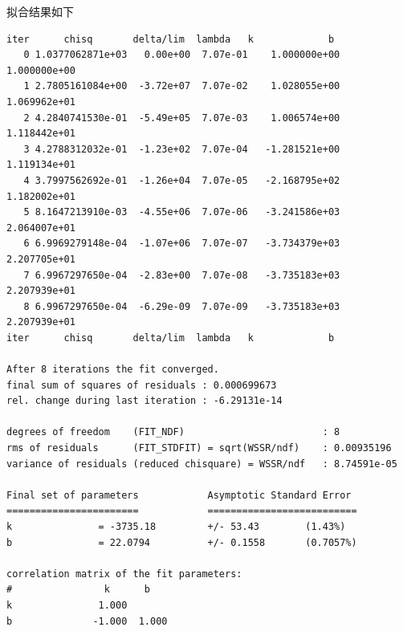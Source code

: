 \documentclass[11pt]{report}
\begin{document}
\begin{enumerate}
拟合结果如下
\begin{verbatim}
iter      chisq       delta/lim  lambda   k             b            
   0 1.0377062871e+03   0.00e+00  7.07e-01    1.000000e+00   1.000000e+00
   1 2.7805161084e+00  -3.72e+07  7.07e-02    1.028055e+00   1.069962e+01
   2 4.2840741530e-01  -5.49e+05  7.07e-03    1.006574e+00   1.118442e+01
   3 4.2788312032e-01  -1.23e+02  7.07e-04   -1.281521e+00   1.119134e+01
   4 3.7997562692e-01  -1.26e+04  7.07e-05   -2.168795e+02   1.182002e+01
   5 8.1647213910e-03  -4.55e+06  7.07e-06   -3.241586e+03   2.064007e+01
   6 6.9969279148e-04  -1.07e+06  7.07e-07   -3.734379e+03   2.207705e+01
   7 6.9967297650e-04  -2.83e+00  7.07e-08   -3.735183e+03   2.207939e+01
   8 6.9967297650e-04  -6.29e-09  7.07e-09   -3.735183e+03   2.207939e+01
iter      chisq       delta/lim  lambda   k             b            

After 8 iterations the fit converged.
final sum of squares of residuals : 0.000699673
rel. change during last iteration : -6.29131e-14

degrees of freedom    (FIT_NDF)                        : 8
rms of residuals      (FIT_STDFIT) = sqrt(WSSR/ndf)    : 0.00935196
variance of residuals (reduced chisquare) = WSSR/ndf   : 8.74591e-05

Final set of parameters            Asymptotic Standard Error
=======================            ==========================
k               = -3735.18         +/- 53.43        (1.43%)
b               = 22.0794          +/- 0.1558       (0.7057%)

correlation matrix of the fit parameters:
#                k      b      
k               1.000 
b              -1.000  1.000 


\end{verbatim}
\end{enumerate}
\end{document}
